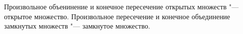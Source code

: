 
	 Произвольное объенинение и конечное пересечение открытых множеств "--- открытое множество. Произвольное пересечение и конечное объединение замкнутых множеств "--- замкнутое множество.
	 